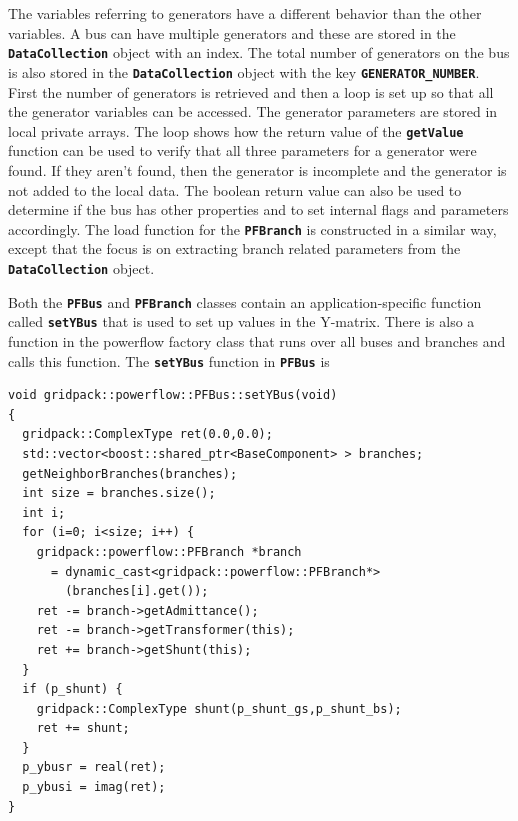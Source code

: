 \documentclass[12pt]{report} %
\begin{document}
The variables referring to generators have a different behavior than the other variables. A bus can have multiple generators and these are stored in the \texttt{\textbf{DataCollection}} object with an index. The total number of generators on the bus is also stored in the \texttt{\textbf{DataCollection}} object with the key \texttt{\textbf{GENERATOR\_NUMBER}}. First the number of generators is retrieved and then a loop is set up so that all the generator variables can be accessed. The generator parameters are stored in local private arrays. The loop shows how the return value of the \texttt{\textbf{getValue}} function can be used to verify that all three parameters for a generator were found. If they aren't found, then the generator is incomplete and the generator is not added to the local data. The boolean return value can also be used to determine if the bus has other properties and to set internal flags and parameters accordingly. The load function for the \texttt{\textbf{PFBranch}} is constructed in a similar way, except that the focus is on extracting branch related parameters from the \texttt{\textbf{DataCollection}} object.

Both the \texttt{\textbf{PFBus}} and \texttt{\textbf{PFBranch}} classes contain an application-specific function called \texttt{\textbf{setYBus}} that is used to set up values in the Y-matrix. There is also a function in the powerflow factory class that runs over all buses and branches and calls this function. The \texttt{\textbf{setYBus}} function in \texttt{\textbf{PFBus}} is

{
\color{red}
\begin{Verbatim}[fontseries=b]
void gridpack::powerflow::PFBus::setYBus(void)
{
  gridpack::ComplexType ret(0.0,0.0);
  std::vector<boost::shared_ptr<BaseComponent> > branches;
  getNeighborBranches(branches);
  int size = branches.size();
  int i;
  for (i=0; i<size; i++) {
    gridpack::powerflow::PFBranch *branch
      = dynamic_cast<gridpack::powerflow::PFBranch*>
        (branches[i].get());
    ret -= branch->getAdmittance();
    ret -= branch->getTransformer(this);
    ret += branch->getShunt(this);
  }
  if (p_shunt) {
    gridpack::ComplexType shunt(p_shunt_gs,p_shunt_bs);
    ret += shunt;
  }
  p_ybusr = real(ret);
  p_ybusi = imag(ret);
}
\end{Verbatim}
}
\end{document}
